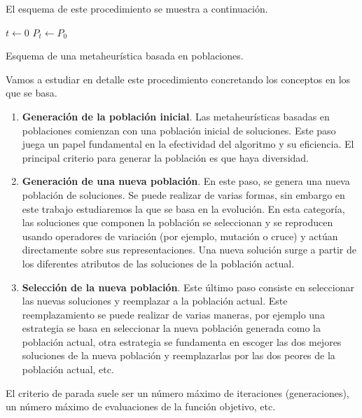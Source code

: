 El esquema de este procedimiento se muestra a continuación.

\begin{Ualgorithm}[H]
    \small
    \DontPrintSemicolon
    $t \longleftarrow 0$\;
    $P_t \longleftarrow P_0$ 
    
    \caption{Esquema de una metaheurística basada en poblaciones.}
\end{Ualgorithm}

Vamos a estudiar en detalle este procedimiento concretando los conceptos en los que se basa.

\begin{enumerate}
    \item \textbf{Generación de la población inicial}. Las metaheurísticas basadas en poblaciones comienzan con una población inicial de soluciones. Este paso juega un papel fundamental en la efectividad del algoritmo y su eficiencia. El principal criterio para generar la población es que haya diversidad.
    \item \textbf{Generación de una nueva población}. En este paso, se genera una nueva población de soluciones. Se puede realizar de varias formas, sin embargo en este trabajo estudiaremos la que se basa en la evolución. En esta categoría, las soluciones que componen la población se seleccionan y se reproducen usando operadores de variación (por ejemplo, mutación o cruce) y actúan directamente sobre sus representaciones. Una nueva solución surge a partir de los diferentes atributos de las soluciones de la población actual.
    \item \textbf{Selección de la nueva población}. Este último paso consiste en seleccionar las nuevas soluciones y reemplazar a la población actual. Este reemplazamiento se puede realizar de varias maneras, por ejemplo una estrategia se basa en seleccionar la nueva población generada como la población actual, otra estrategia se fundamenta en escoger las dos mejores soluciones de la nueva población y reemplazarlas por las dos peores de la población actual, etc.
\end{enumerate}

El criterio de parada suele ser un número máximo de iteraciones (generaciones), un número máximo de evaluaciones de la función objetivo, etc.

